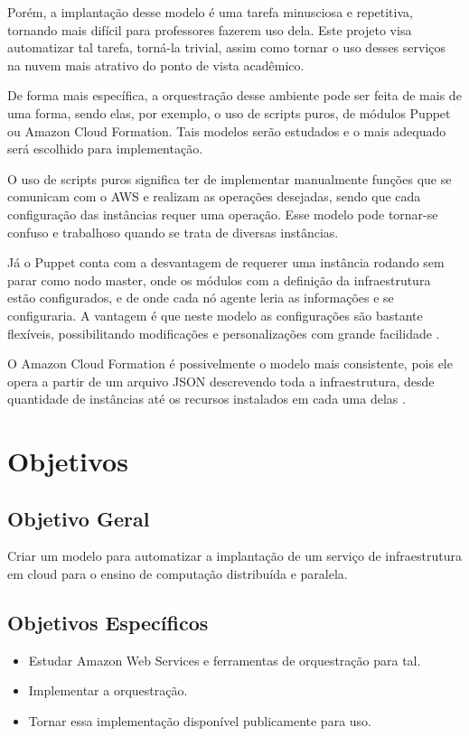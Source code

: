 \documentclass[12pt]{article}
\begin{document}
Porém, a implantação desse modelo é uma tarefa minusciosa e repetitiva, tornando mais difícil para professores fazerem uso dela. Este projeto visa automatizar tal tarefa, torná-la trivial, assim como tornar o uso desses serviços na nuvem mais atrativo do ponto de vista acadêmico.

De forma mais específica, a orquestração desse ambiente pode ser feita de mais de uma forma, sendo elas, por exemplo, o uso de scripts puros, de módulos Puppet ou Amazon Cloud Formation. Tais modelos serão estudados e o mais adequado será escolhido para implementação.

O uso de scripts puros significa ter de implementar manualmente funções que se comunicam com o AWS e realizam as operações desejadas, sendo que cada configuração das instâncias requer uma operação. Esse modelo pode tornar-se confuso e trabalhoso quando se trata de diversas instâncias.

Já o Puppet conta com a desvantagem de requerer uma instância rodando sem parar como nodo master, onde os módulos com a definição da infraestrutura estão configurados, e de onde cada nó agente leria as informações e se configuraria. A vantagem é que neste modelo as configurações são bastante flexíveis, possibilitando modificações e personalizações com grande facilidade \cite{puppetaws}.

O Amazon Cloud Formation é possivelmente o modelo mais consistente, pois ele opera a partir de um arquivo JSON descrevendo toda a infraestrutura, desde quantidade de instâncias até os recursos instalados em cada uma delas \cite{awscf}.


\section{Objetivos}
\subsection{Objetivo Geral}
Criar um modelo para automatizar a implantação de um serviço de infraestrutura em cloud para o ensino de computação distribuída e paralela.

\subsection{Objetivos Específicos}
\begin{itemize}
	\item Estudar Amazon Web Services e ferramentas de orquestração para tal.
	\item Implementar a orquestração.
	\item Tornar essa implementação disponível publicamente para uso.
    
\end{itemize}
\end{document}
